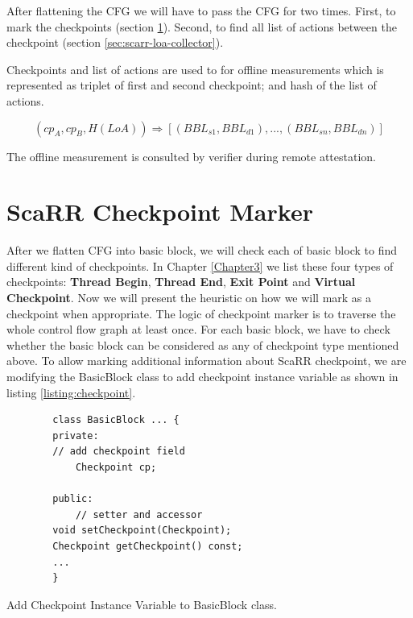After flattening the CFG we will have to pass the CFG for two times. First, to
mark the checkpoints (section \ref{sec:scarr-checkpoint-marker}). Second, to
find all list of actions between the checkpoint (section
\ref{sec:scarr-loa-collector}).

Checkpoints and list of actions are used to for offline measurements which is
represented as triplet of first and second checkpoint; and hash of the list of
actions.

$$(cp_A, cp_B, H(LoA)) \Rightarrow [(BBL_{s1}, BBL_{d1}), ..., (BBL_{sn},
BBL_{dn})]$$

The offline measurement is consulted by verifier during remote attestation.

\section{ScaRR Checkpoint Marker} 
\label{sec:scarr-checkpoint-marker}

After we flatten CFG into basic block, we will check each of basic block to find
different kind of checkpoints. In Chapter \ref{Chapter3} we list these four
types of checkpoints: \textbf{Thread Begin}, \textbf{Thread End}, \textbf{Exit
Point} and \textbf{Virtual Checkpoint}. Now we will present the heuristic on how
we will mark as a checkpoint when appropriate.  The logic of checkpoint marker
is to traverse the whole control flow graph at least once. For each basic block,
we have to check whether the basic block can be considered as any of checkpoint
type mentioned above. To allow marking additional information about ScaRR
checkpoint, we are modifying the BasicBlock class to add checkpoint instance
variable as shown in listing \ref{listing:checkpoint}.

\begin{listing}[htbp]
    \begin{verbatim}
        class BasicBlock ... {
        private:
        // add checkpoint field
            Checkpoint cp;

        public:
            // setter and accessor
        void setCheckpoint(Checkpoint);
        Checkpoint getCheckpoint() const;
        ...
        }
    \end{verbatim}
    \caption{Add Checkpoint Instance Variable to BasicBlock class.}    
    \label{listing:checkpoint}
\end{listing}

